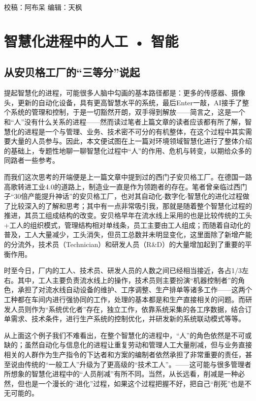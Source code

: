 \documentclass[
]{book}
\begin{document}
校稿：阿布呆
编辑：天枫

\hypertarget{ux667aux6167ux5316ux8fdbux7a0bux4e2dux7684ux4ebaux5de5-ux667aux80fd}{%
\section{智慧化进程中的人工 • 智能}\label{ux667aux6167ux5316ux8fdbux7a0bux4e2dux7684ux4ebaux5de5-ux667aux80fd}}

\hypertarget{ux4eceux5b89ux8d1dux683cux5de5ux5382ux7684ux4e09ux7b49ux5206ux8bf4ux8d77}{%
\subsection{从安贝格工厂的``三等分''说起}\label{ux4eceux5b89ux8d1dux683cux5de5ux5382ux7684ux4e09ux7b49ux5206ux8bf4ux8d77}}

提起智慧化的进程，可能很多人脑中勾画的基本路径都是：更多的传感器、摄像头，更新的自动化设备，具有更高智慧水平的系统，最后Enter一敲，AI接手了整个系统的管理和控制，于是一切豁然开朗，双手得到解放------简言之，这是一个和``人''没有什么关系的进程------然而读过笔者上篇文章的读者应该都有所了解，智慧化的进程是一个与管理、业务、技术密不可分的有机整体，在这个过程中其实需要大量的人员参与。因此，本文便试图在上一篇对环境领域智慧化进行了整体介绍的基础上，专题性地聊一聊智慧化过程中``人''的作用、危机与转变，以期给众多的同路者一些参考。

而我们这次思考的开端便是上一篇文章中提到过的西门子安贝格工厂。在德国一路高歌转进工业4.0的道路上，制造业一直是作为领跑者的存在。笔者曾亲临过西门子``30倍产能提升神话''的安贝格工厂，也对其自动化-数字化-智慧化的进化过程做了比较深入的了解和思考；其中有一点非常吸引我，那就是随着整个智慧化过程的推进，其员工组成结构的改变。安贝格早年在流水线上采用的也是比较传统的工头+工人的组织模式，管理结构相对单线条，员工主要由工人组成；而随着自动化的普及，工人大量减少，工头消失，但员工总数并未明显变化，这里面除了新增产能的分流外，技术员（Technician）和研发人员（R\&D）的大量增加起到了重要的平衡作用。

时至今日，厂内的工人、技术员、研发人员的人数之间已经相当接近，各占1/3左右。其中，工人主要负责流水线上的操作，技术员则主要扮演``机器控制者''的角色，承担了对流水线自动设备的维护、工序调整、生产排单等诸多工作------这两个工种都在车间内进行强协同的工作，处理的基本都是和生产直接相关的问题。而研发人员则作为``系统优化者''存在，独立工作，依靠系统采集的各工序数据，结合订单需求、技术条件，进行生产系统的控制优化，并研发新的系统联动模式等等。

从上面这个例子我们不难看出，在整个智慧化的进程中，``人''的角色依然是不可或缺的；虽然自动化与信息化的进程让重复劳动和管理人工大量削减，但与业务直接相关的人群作为生产指令的下达者和方案的编制者依然承担了非常重要的责任，甚至说由传统的``一般工人''升级为了更高级的``技术工人''。------这可能与很多管理者所想象的智慧化进程中的``人员削减''有所不同。当然，从长远看，削减是一种必然，但也是一个漫长的``进化''过程，如果这个过程把握不好，把自己``削死''也是不无可能的。
\end{document}
